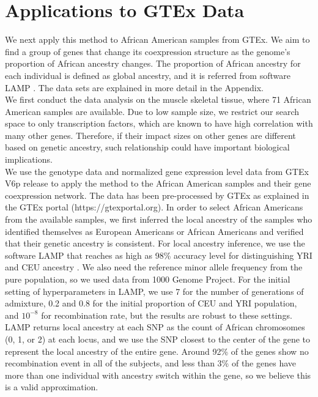 \documentclass[aap, preprint]{imsart}
\numberwithin{equation}{section}
\theoremstyle{plain}
\begin{document}
\section{Applications to GTEx Data} \label{sec:applications}
We next apply this method to African American samples from GTEx. We aim to find a group of genes that change its coexpression structure as the genome's proportion of African ancestry changes. The proportion of African ancestry for each individual is defined as global ancestry, and it is referred from software LAMP \cite{pacsaniuc2009imputation}. The data sets are explained in more detail in the Appendix.\\

We first conduct the data analysis on the muscle skeletal tissue, where 71 African American samples are available. Due to low sample size, we restrict our search space to only transcription factors, which are known to have high correlation with many other genes. Therefore, if their impact sizes on other genes are different based on genetic ancestry, such relationship could have important biological implications. \\

We use the genotype data and normalized gene expression level data from GTEx V6p release \cite{lonsdale2013genotype} to apply the method to the African American samples and their gene coexpression network. The data has been pre-processed by GTEx as explained in the GTEx portal (https://gtexportal.org). In order to select African Americans from the available samples, we first inferred the local ancestry of the samples who identified themselves as European Americans or African Americans and verified that their genetic ancestry is consistent. For local ancestry inference, we use the software LAMP that reaches as high as 98\% accuracy level for distinguishing YRI and CEU ancestry \cite{pacsaniuc2009imputation}. We also need the reference minor allele frequency from the pure population, so we used data from 1000 Genome Project. For the initial setting of hyperparameters in LAMP, we use 7 for the number of generations of admixture, 0.2 and 0.8 for the initial proportion of CEU and YRI population, and $10^{-8}$ for recombination rate, but the results are robust to these settings. LAMP returns local ancestry at each SNP as the count of African chromosomes (0, 1, or 2) at each locus, and we use the SNP closest to the center of the gene to represent the local ancestry of the entire gene.  Around 92\% of the genes show no recombination event in all of the subjects, and less than 3\% of the genes have more than one individual with ancestry switch within the gene, so we believe this is a valid approximation. \\
\end{document}
